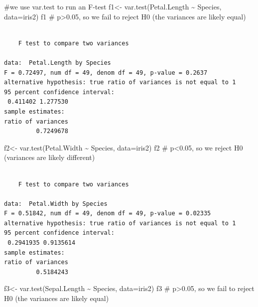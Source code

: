 \documentclass[
  letterpaper,
  DIV=11,
  numbers=noendperiod]{scrartcl}
\newenvironment{Shaded}{\begin{snugshade}}{\end{snugshade}}
\newcommand{\AttributeTok}[1]{\textcolor[rgb]{0.40,0.45,0.13}{#1}}
\newcommand{\CommentTok}[1]{\textcolor[rgb]{0.37,0.37,0.37}{#1}}
\newcommand{\FunctionTok}[1]{\textcolor[rgb]{0.28,0.35,0.67}{#1}}
\newcommand{\NormalTok}[1]{\textcolor[rgb]{0.00,0.23,0.31}{#1}}
\newcommand{\OtherTok}[1]{\textcolor[rgb]{0.00,0.23,0.31}{#1}}
\newcommand{\SpecialCharTok}[1]{\textcolor[rgb]{0.37,0.37,0.37}{#1}}
\begin{document}
\begin{Shaded}
\begin{Highlighting}[]
\CommentTok{\#we use var.test to run an F{-}test}
\NormalTok{f1}\OtherTok{\textless{}{-}} \FunctionTok{var.test}\NormalTok{(Petal.Length }\SpecialCharTok{\textasciitilde{}}\NormalTok{ Species, }\AttributeTok{data=}\NormalTok{iris2)}
\NormalTok{f1 }\CommentTok{\# p\textgreater{}0.05, so we fail to reject H0 (the variances are likely equal)}
\end{Highlighting}
\end{Shaded}

\begin{verbatim}

    F test to compare two variances

data:  Petal.Length by Species
F = 0.72497, num df = 49, denom df = 49, p-value = 0.2637
alternative hypothesis: true ratio of variances is not equal to 1
95 percent confidence interval:
 0.411402 1.277530
sample estimates:
ratio of variances 
         0.7249678 
\end{verbatim}

\begin{Shaded}
\begin{Highlighting}[]
\NormalTok{f2}\OtherTok{\textless{}{-}} \FunctionTok{var.test}\NormalTok{(Petal.Width }\SpecialCharTok{\textasciitilde{}}\NormalTok{ Species, }\AttributeTok{data=}\NormalTok{iris2)}
\NormalTok{f2 }\CommentTok{\# p\textless{}0.05, so we reject H0 (variances are likely different)}
\end{Highlighting}
\end{Shaded}

\begin{verbatim}

    F test to compare two variances

data:  Petal.Width by Species
F = 0.51842, num df = 49, denom df = 49, p-value = 0.02335
alternative hypothesis: true ratio of variances is not equal to 1
95 percent confidence interval:
 0.2941935 0.9135614
sample estimates:
ratio of variances 
         0.5184243 
\end{verbatim}

\begin{Shaded}
\begin{Highlighting}[]
\NormalTok{f3}\OtherTok{\textless{}{-}} \FunctionTok{var.test}\NormalTok{(Sepal.Length }\SpecialCharTok{\textasciitilde{}}\NormalTok{ Species, }\AttributeTok{data=}\NormalTok{iris2)}
\NormalTok{f3 }\CommentTok{\# p\textgreater{}0.05, so we fail to reject H0 (the variances are likely equal)}
\end{Highlighting}
\end{Shaded}
\end{document}
